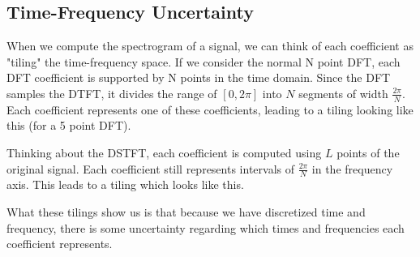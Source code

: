 \documentclass{article}
\begin{document}
\subsection{Time-Frequency Uncertainty} 
When we compute the spectrogram of a signal, we can think of each coefficient as "tiling" the time-frequency space.
If we consider the normal N point DFT, each DFT coefficient is supported by N points in the time domain. Since the DFT samples the DTFT, it divides the range of $[0, 2\pi]$
into $N$ segments of width $\frac{2\pi}{N}$. Each coefficient represents one of these coefficients, leading to a tiling looking like this (for a 5 point DFT).
\begin{figure}[H]
  \centering
\end{figure}
Thinking about the DSTFT, each coefficient is computed using $L$ points of the original signal. Each coefficient
still represents intervals of $\frac{2\pi}{N}$ in the frequency axis. This leads to a tiling which looks like this.
\begin{figure}[H]
  \centering
\end{figure}
What these tilings show us is that because we have discretized time and frequency,
there is some uncertainty regarding which times and frequencies each coefficient represents.
\end{document}
